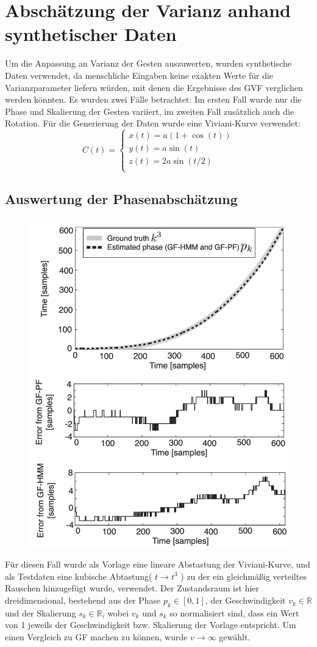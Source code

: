 \documentclass{llncs}
\begin{document}
\section{Abschätzung der Varianz anhand synthetischer Daten}
Um die Anpassung an Varianz der Gesten auszuwerten, wurden synthetische Daten verwendet, da menschliche Eingaben keine exakten Werte für die Varianzparameter liefern würden, mit denen die Ergebnisse des GVF verglichen werden könnten. Es wurden zwei Fälle betrachtet: Im ersten Fall wurde nur die Phase und Skalierung der Gesten variiert, im zweiten Fall zusätzlich auch die Rotation. Für die Generierung der Daten wurde eine Viviani-Kurve verwendet:
\begin{equation}
C(t)=\left\{\begin{array}{l}
x(t)=a(1+\cos(t))\\
y(t)=a\sin(t)\\
z(t)=2a\sin(t/2)\\
\end{array}\right.
\end{equation} 

\subsection{Auswertung der Phasenabschätzung}
\begin{figure}
\centering
\includegraphics[width=0.7\linewidth]{../Bilder/Fig6}
\caption{}
\label{fig:Fig6}
\end{figure}
Für diesen Fall wurde als Vorlage eine lineare Abstastung der Viviani-Kurve, und als Testdaten eine kubische Abtastung( $ t \rightarrow t^3 $ ) zu der ein gleichmäßig verteiltes Rauschen hinzugefügt wurde, verwendet. Der Zustandsraum ist hier dreidimensional, bestehend aus der Phase $ p_k \in [0,1] $, der Geschwindigkeit $v_k \in \mathbb{R}$ und der Skalierung $s_k \in \mathbb{R}$, wobei $v_k$ und $s_k$ so normalisiert sind, dass ein Wert von 1 jeweils der Geschwindigkeit bzw. Skalierung der Vorlage entspricht. Um einen Vergleich zu GF machen zu können, wurde $v \rightarrow \infty$ gewählt.
\end{document}
